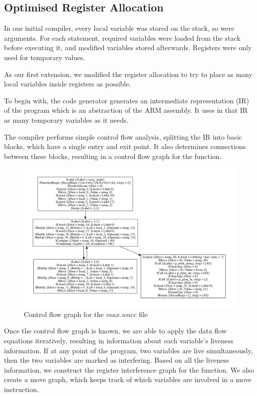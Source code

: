 \documentclass{article}
\begin{document}
\subsection{Optimised Register Allocation}
In our initial compiler, every local variable was stored on the stack, so were arguments. For each statement, required variables were loaded
from the stack before executing it, and modified variables stored afterwards. Registers were only used for temporary values.

As our first extension, we modified the register allocation to try to place as many local variables inside registers as possible.

To begin with, the code generator generates an intermediate representation (IR) of the program which is an abstraction of the ARM assembly.
It uses in that IR as many temporary variables as it needs.

The compiler performs simple control flow analysis, splitting the IR into basic blocks, which have a single entry and exit point. It
also determines connections between these blocks, resulting in a control flow graph for the function.

\begin{figure}
  \centering
  \includegraphics[width=.7\textwidth]{max-cfg.pdf}
  \caption{Control flow graph for the $max.wacc$ file}
\end{figure}

Once the control flow graph is known, we are able to apply the data flow equations iteratively, resulting in information about each
variable's liveness information. If at any point of the program, two variables are live simultaneously, then the two variables are marked
as interfering. Based on all the liveness information, we construct the register interference graph for the function.
We also create a move graph, which keeps track of which variables are involved in a move instruction.
\end{document}
